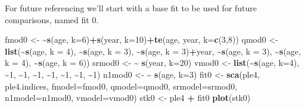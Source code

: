 \documentclass[
]{book}
\newenvironment{Shaded}{\begin{snugshade}}{\end{snugshade}}
\newcommand{\AttributeTok}[1]{\textcolor[rgb]{0.13,0.29,0.53}{#1}}
\newcommand{\DecValTok}[1]{\textcolor[rgb]{0.00,0.00,0.81}{#1}}
\newcommand{\ErrorTok}[1]{\textcolor[rgb]{0.64,0.00,0.00}{\textbf{#1}}}
\newcommand{\FunctionTok}[1]{\textcolor[rgb]{0.13,0.29,0.53}{\textbf{#1}}}
\newcommand{\NormalTok}[1]{#1}
\newcommand{\OtherTok}[1]{\textcolor[rgb]{0.56,0.35,0.01}{#1}}
\newcommand{\SpecialCharTok}[1]{\textcolor[rgb]{0.81,0.36,0.00}{\textbf{#1}}}
\begin{document}
For future referencing we'll start with a base fit to be used for future comparisons, named fit 0.

\begin{Shaded}
\begin{Highlighting}[]
\NormalTok{fmod0 }\OtherTok{\textless{}{-}} \ErrorTok{\textasciitilde{}}\FunctionTok{s}\NormalTok{(age, }\AttributeTok{k=}\DecValTok{6}\NormalTok{)}\SpecialCharTok{+}\FunctionTok{s}\NormalTok{(year, }\AttributeTok{k=}\DecValTok{10}\NormalTok{)}\SpecialCharTok{+}\FunctionTok{te}\NormalTok{(age, year, }\AttributeTok{k=}\FunctionTok{c}\NormalTok{(}\DecValTok{3}\NormalTok{,}\DecValTok{8}\NormalTok{))}
\NormalTok{qmod0 }\OtherTok{\textless{}{-}} \FunctionTok{list}\NormalTok{(}\SpecialCharTok{\textasciitilde{}}\FunctionTok{s}\NormalTok{(age, }\AttributeTok{k =} \DecValTok{4}\NormalTok{), }\SpecialCharTok{\textasciitilde{}}\FunctionTok{s}\NormalTok{(age, }\AttributeTok{k =} \DecValTok{3}\NormalTok{), }\SpecialCharTok{\textasciitilde{}}\FunctionTok{s}\NormalTok{(age, }\AttributeTok{k =} \DecValTok{3}\NormalTok{)}\SpecialCharTok{+}\NormalTok{year, }\SpecialCharTok{\textasciitilde{}}\FunctionTok{s}\NormalTok{(age, }\AttributeTok{k =} \DecValTok{3}\NormalTok{), }\SpecialCharTok{\textasciitilde{}}\FunctionTok{s}\NormalTok{(age, }\AttributeTok{k =} \DecValTok{4}\NormalTok{), }\SpecialCharTok{\textasciitilde{}}\FunctionTok{s}\NormalTok{(age, }\AttributeTok{k =} \DecValTok{6}\NormalTok{))}
\NormalTok{srmod0 }\OtherTok{\textless{}{-}} \ErrorTok{\textasciitilde{}} \FunctionTok{s}\NormalTok{(year, }\AttributeTok{k=}\DecValTok{20}\NormalTok{)}
\NormalTok{vmod0 }\OtherTok{\textless{}{-}} \FunctionTok{list}\NormalTok{(}\SpecialCharTok{\textasciitilde{}}\FunctionTok{s}\NormalTok{(age, }\AttributeTok{k=}\DecValTok{4}\NormalTok{), }\SpecialCharTok{\textasciitilde{}}\DecValTok{1}\NormalTok{,  }\SpecialCharTok{\textasciitilde{}}\DecValTok{1}\NormalTok{, }\SpecialCharTok{\textasciitilde{}}\DecValTok{1}\NormalTok{, }\SpecialCharTok{\textasciitilde{}}\DecValTok{1}\NormalTok{, }\SpecialCharTok{\textasciitilde{}}\DecValTok{1}\NormalTok{, }\SpecialCharTok{\textasciitilde{}}\DecValTok{1}\NormalTok{, }\SpecialCharTok{\textasciitilde{}}\DecValTok{1}\NormalTok{)}
\NormalTok{n1mod0 }\OtherTok{\textless{}{-}} \ErrorTok{\textasciitilde{}} \FunctionTok{s}\NormalTok{(age, }\AttributeTok{k=}\DecValTok{3}\NormalTok{)}
\NormalTok{fit0 }\OtherTok{\textless{}{-}} \FunctionTok{sca}\NormalTok{(ple4, ple4.indices, }\AttributeTok{fmodel=}\NormalTok{fmod0, }\AttributeTok{qmodel=}\NormalTok{qmod0, }\AttributeTok{srmodel=}\NormalTok{srmod0, }\AttributeTok{n1model=}\NormalTok{n1mod0, }\AttributeTok{vmodel=}\NormalTok{vmod0)}
\NormalTok{stk0 }\OtherTok{\textless{}{-}}\NormalTok{ ple4 }\SpecialCharTok{+}\NormalTok{ fit0}
\FunctionTok{plot}\NormalTok{(stk0)}
\end{Highlighting}
\end{Shaded}
\end{document}
